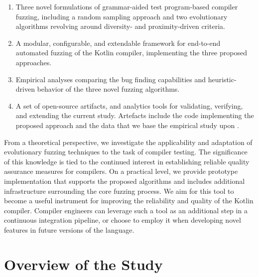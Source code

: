 \begin{enumerate}
	\item Three novel formulations of grammar-aided test program-based compiler fuzzing,
including a random sampling approach
and two evolutionary algorithms revolving
around diversity- and proximity-driven criteria.
	\item A modular, configurable, and extendable framework for
end-to-end automated fuzzing of the Kotlin compiler,
implementing the three proposed approaches.
	\item Empirical analyses comparing the bug finding capabilities
and heuristic-driven behavior of the three novel fuzzing algorithms.
	\item A set of open-source artifacts, and analytics tools
for validating, verifying, and extending the current study. 
Artefacts include the code implementing the proposed approach \cite{kotfuzz-impl} and the data that we base the empirical study upon \cite{kotfuzz-data}.
\end{enumerate}

From a theoretical perspective, we investigate the applicability
and adaptation of evolutionary fuzzing techniques to the task of compiler testing. 
The significance of this knowledge is tied to the continued
interest in establishing reliable quality assurance measures for compilers.
On a practical level, we provide
prototype implementation that supports the proposed algorithms
and includes additional infrastructure surrounding the core fuzzing process.
We aim for this tool to become a useful instrument for improving the 
reliability and quality of the Kotlin compiler.
Compiler engineers can leverage such a tool as an additional
step in a continuous integration pipeline, or choose to employ it
when developing novel features in future versions of the language.

\section{Overview of the Study}

